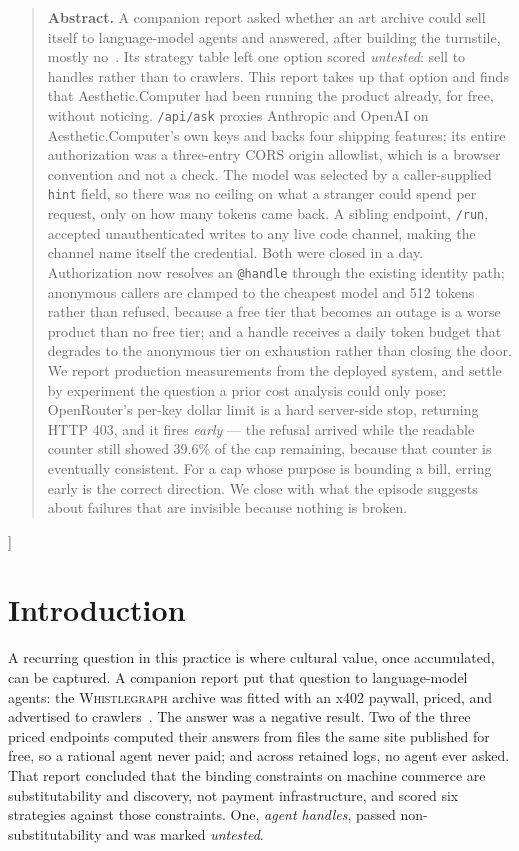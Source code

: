 \documentclass[10pt,letterpaper,twocolumn]{article}
\newcommand{\acdot}{{\color{acpink}.}}
\newcommand{\ac}{Aesthetic{\acdot}Computer}
\newcommand{\code}[1]{\texttt{#1}}
\begin{document}
{\begin{quote}
\small\noindent\textbf{Abstract.}
A companion report asked whether an art archive could sell itself to language-model
agents and answered, after building the turnstile, mostly no~\citep{scudder2026x402}.
Its strategy table left one option scored \emph{untested}: sell to handles rather
than to crawlers. This report takes up that option and finds that \ac{} had been
running the product already, for free, without noticing. \code{/api/ask} proxies
Anthropic and OpenAI on \ac{}'s own keys and backs four shipping features; its
entire authorization was a three-entry CORS origin allowlist, which is a browser
convention and not a check. The model was selected by a caller-supplied
\code{hint} field, so there was no ceiling on what a stranger could spend per
request, only on how many tokens came back. A sibling endpoint, \code{/run},
accepted unauthenticated writes to any live code channel, making the channel name
itself the credential. Both were closed in a day. Authorization now resolves an
\code{@handle} through the existing identity path; anonymous callers are clamped
to the cheapest model and 512 tokens rather than refused, because a free tier
that becomes an outage is a worse product than no free tier; and a handle
receives a daily token budget that degrades to the anonymous tier on exhaustion
rather than closing the door. We report production measurements from the
deployed system, and settle by experiment the question a prior cost analysis
could only pose: OpenRouter's per-key dollar limit is a hard server-side stop,
returning HTTP 403, and it fires \emph{early} --- the refusal arrived while the
readable counter still showed 39.6\% of the cap remaining, because that counter
is eventually consistent. For a cap whose purpose is bounding a bill, erring
early is the correct direction. We close with what the episode suggests about
failures that are invisible because nothing is broken.
\end{quote}
\vspace{0.5em}
}]

\section{Introduction}

A recurring question in this practice is where cultural value, once accumulated,
can be captured. A companion report put that question to language-model agents:
the \textsc{Whistlegraph} archive was fitted with an x402 paywall, priced, and
advertised to crawlers~\citep{scudder2026x402}. The answer was a negative result.
Two of the three priced endpoints computed their answers from files the same
site published for free, so a rational agent never paid; and across retained
logs, no agent ever asked. That report concluded that the binding constraints on
machine commerce are substitutability and discovery, not payment infrastructure,
and scored six strategies against those constraints. One, \emph{agent handles},
passed non-substitutability and was marked \emph{untested}.
\end{document}
